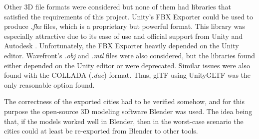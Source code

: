 Other 3D file formats were considered but none of them had libraries that satisfied the requirements of this project.
Unity's FBX Exporter \cite{fbxexporter} could be used to produce \textit{.fbx} \cite{fbx} files, which is a proprietary but powerful format.
This library was especially attractive due to its ease of use and official support from Unity and Autodesk \cite{fbxexporter}.
Unfortunately, the FBX Exporter heavily depended on the Unity editor.
Wavefront's \textit{.obj} \cite{obj_files} and \textit{.mtl} \cite{mtl_files} files were also considered, but the libraries found either depended on the Unity editor or were deprecated.
Similar issues were also found with the COLLADA (\textit{.dae}) \cite{collada_files} format.
Thus, glTF using UnityGLTF was the only reasonable option found.

The correctness of the exported cities had to be verified somehow, and for this purpose the open-source 3D modeling software Blender \cite{blender} was used. 
The idea being that, if the models worked well in Blender, then in the worst-case scenario the cities could at least be re-exported from Blender to other tools.
